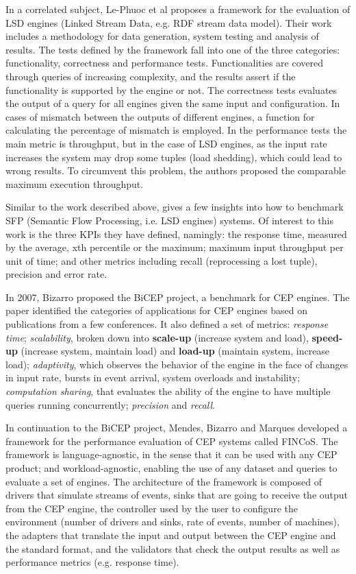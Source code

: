 \documentclass[ppgc,diss,english]{iiufrgs}
\begin{document}
In a correlated subject, Le-Phuoc et al \cite{le2012linked, le2013elastic} proposes a framework for the evaluation of LSD engines (Linked Stream Data, e.g. RDF stream data model). Their work includes a methodology for data generation, system testing and analysis of results. The tests defined by the framework fall into one of the three categories: functionality, correctness and performance tests. Functionalities are covered through queries of increasing complexity, and the results assert if the functionality is supported by the engine or not. The correctness tests evaluates the output of a query for all engines given the same input and configuration. In cases of mismatch between the outputs of different engines, a function for calculating the percentage of mismatch is employed. In the performance tests the main metric is throughput, but in the case of LSD engines, as the input rate increases the system may drop some tuples (load shedding), which could lead to wrong results. To circumvent this problem, the authors proposed the comparable maximum execution throughput.

Similar to the work described above, \cite{scharrenbach2013seven} gives a few insights into how to benchmark SFP (Semantic Flow Processing, i.e. LSD engines) systems. Of interest to this work is the three KPIs they have defined, namingly: the response time, measured by the average, xth percentile or the maximum; maximum input throughput per unit of time; and other metrics including recall (reprocessing a lost tuple), precision and error rate.


In 2007, Bizarro \cite{bizarro2007bicep} proposed the BiCEP project, a benchmark for CEP engines. The paper identified the categories of applications for CEP engines based on publications from a few conferences. It also defined a set of metrics: \emph{response time}; \emph{scalability}, broken down into \textbf{scale-up} (increase system and load), \textbf{speed-up} (increase system, maintain load) and \textbf{load-up} (maintain system, increase load); \emph{adaptivity}, which observes the behavior of the engine in the face of changes in input rate, bursts in event arrival, system overloads and instability; \emph{computation sharing}, that evaluates the ability of the engine to have multiple queries running concurrently; \emph{precision} and \emph{recall}.

In continuation to the BiCEP project, Mendes, Bizarro and Marques \cite{mendes2008framework} developed a framework for the performance evaluation of CEP systems called FINCoS. The framework is language-agnostic, in the sense that it can be used with any CEP product; and workload-agnostic, enabling the use of any dataset and queries to evaluate a set of engines. The architecture of the framework is composed of drivers that simulate streams of events, sinks that are going to receive the output from the CEP engine, the controller used by the user to configure the environment (number of drivers and sinks, rate of events, number of machines), the adapters that translate the input and output between the CEP engine and the standard format, and the validators that check the output results as well as performance metrics (e.g. response time).
\end{document}
